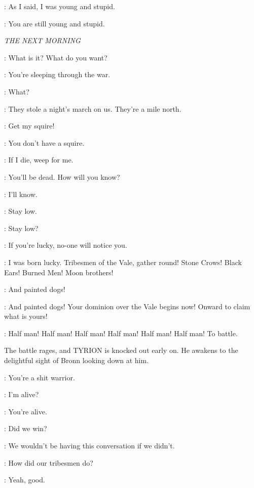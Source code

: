 \TYRION: As I said, I was young and stupid. 

\SHAE: You are still young and stupid. 


\scene

\textit{THE NEXT MORNING} 


\TYRION: What is it? What do you want? 

\BRONN: You're sleeping through the war. 

\TYRION: What? 

\BRONN: They stole a night's march on us. They're a mile north. 

\TYRION: Get my squire! 

\BRONN: You don't have a squire. 

\TYRION: If I die, weep for me. 

\SHAE: You'll be dead. How will you know? 

\TYRION: I'll know. 


\BRONN: Stay low. 

\TYRION: Stay low? 

\BRONN: If you're lucky, no-one will notice you. 

\TYRION: I was born lucky. Tribesmen of the Vale, gather round! Stone Crows! Black Ears! Burned Men! Moon brothers! 

\HILLTRIBESMAN: And painted dogs! 

\TYRION: And painted dogs! Your dominion over the Vale begins now! Onward to claim what is yours! 

\CROWD: Half man! Half man! Half man! Half man! Half man! Half man! To battle. 


\n The battle rages, and TYRION is knocked out early on.  He awakens to the delightful sight of Bronn looking down at him.

\BRONN: You're a shit warrior. 

\TYRION: I'm alive? 

\BRONN: You're alive. 

\TYRION: Did we win? 

\BRONN: We wouldn't be having this conversation if we didn't. 

\TYRION: How did our tribesmen do? 

\BRONN: Yeah, good. 

